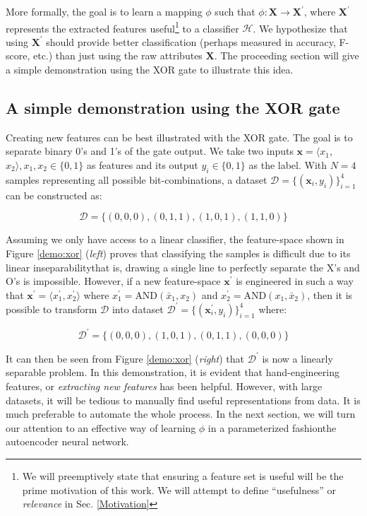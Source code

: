 \par More formally, the goal is to learn a mapping $\phi$ such that $\phi:
\mathbf{X} \rightarrow \mathbf{X}^{\prime}$, where $\mathbf{X}^{\prime}$
represents the extracted features useful\footnote{
  We will preemptively state that ensuring a feature set is useful will
  be the prime motivation of this work. We will attempt to define ``usefulness''
  or \textit{relevance} in Sec. \ref{Motivation}
} to a classifier $\mathcal{H}$. We
hypothesize that using $\mathbf{X}^{\prime}$ should provide better
classification (perhaps measured in accuracy, F-score, etc.) than just using
the raw attributes $\mathbf{X}$. The proceeding section will give a
simple demonstration using the XOR gate to illustrate this idea.

\subsection{A simple demonstration using the XOR gate}

\par Creating new features can be best illustrated with the XOR gate. The
goal is to separate binary 0's and 1's of the gate output. We take two
inputs $\mathbf{x} = \langle x_{1}$, $x_{2} \rangle, x_1, x_2 \in \{0,1\}$ as
features and its output $y_{i} \in \{0,1\}$ as the label. With $N=4$ samples
representing all possible bit-combinations, a dataset
$\mathcal{D}=\{(\mathbf{x}_{i}, y_{i})\}_{i=1}^{4}$ can be constructed as:

\[
    \mathcal{D} = \{(0,0,0), (0,1,1), (1,0,1), (1,1,0)\}
\]

Assuming we only have access to a linear classifier, the feature-space shown
in Figure \ref{demo:xor} (\textit{left}) proves that classifying the samples
is difficult due to its linear inseparability\textemdash that is, drawing a
single line to perfectly separate the X's and O's is impossible.
However, if a new feature-space $\mathbf{x}^{\prime}$ is engineered in such a
way that $\mathbf{x}^{\prime} = \langle {x}^{\prime}_{1}, {x}^{\prime}_2 \rangle$ where 
$x^{\prime}_{1} = \text{AND}(\bar{x}_{1}, x_{2})$ and $x^{\prime}_{2}
= \text{AND}(x_{1}, \bar{x}_{2})$, then it is possible to transform $\mathcal{D}$
into dataset $\mathcal{D}^{\prime}=\{(\mathbf{x}^{\prime}_{i}, y_{i})\}_{i=1}^{4}$
where:

\[
    \mathcal{D}^{\prime} = \{(0,0,0), (1,0,1), (0,1,1), (0,0,0)\}
\]

\par It can then be seen from Figure \ref{demo:xor} (\textit{right}) that
$\mathcal{D}^{\prime}$ is now a linearly separable problem. In this
demonstration, it is evident that hand-engineering features, or
\textit{extracting new features} has been helpful. However, with large
datasets, it will be tedious to manually find useful representations from
data. It is much preferable to automate the whole process. In the next
section, we will turn our attention to an effective way of learning $\phi$ in
a parameterized fashion\textemdash the autoencoder neural network.

